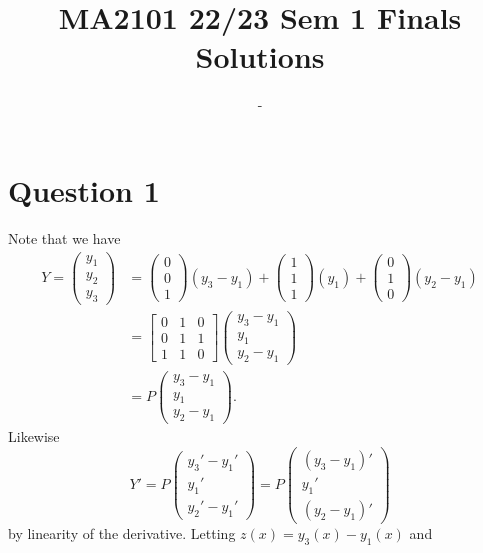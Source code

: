\documentclass[12pt]{article}
\title{MA2101 22/23 Sem 1 Finals Solutions}
\author{-}
\begin{document}
\maketitle

\section*{Question 1}
Note that we have
\begin{align*}
Y
=\begin{pmatrix} y_1\\y_2\\y_3 \end{pmatrix}
&=\begin{pmatrix} 0\\0\\1 \end{pmatrix}(y_3-y_1)
+\begin{pmatrix} 1\\1\\1 \end{pmatrix}(y_1)
+\begin{pmatrix} 0\\1\\0 \end{pmatrix}(y_2-y_1)
\\&=\begin{bmatrix} 0&1&0\\0&1&1\\1&1&0 \end{bmatrix}
\begin{pmatrix} y_3-y_1\\y_1\\y_2-y_1 \end{pmatrix} 
\\&=P
\begin{pmatrix} y_3-y_1\\y_1\\y_2-y_1 \end{pmatrix} 
.
\end{align*}
Likewise 
\[
    Y'
=P\begin{pmatrix} y_3'-y_1'\\y_1'\\y_2'-y_1' \end{pmatrix} 
=P\begin{pmatrix} (y_3-y_1)'\\y_1'\\(y_2-y_1)' \end{pmatrix} 
\]
by linearity of the derivative. Letting $z(x)=y_3(x)-y_1(x)$ and
\end{document}
